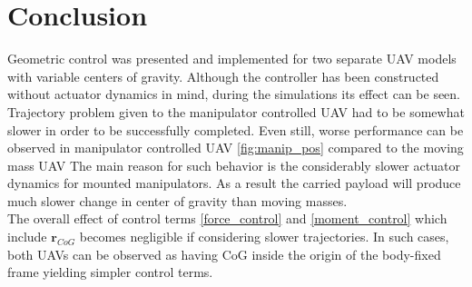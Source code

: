 \section{Conclusion}

Geometric control was presented and implemented for two separate UAV models with variable centers of gravity. Although the controller has been constructed without actuator dynamics in mind, during the simulations its effect can be seen. Trajectory problem given to the manipulator controlled UAV had to be somewhat slower in order to be successfully completed. Even still, worse performance can be observed in manipulator controlled UAV \ref{fig:manip_pos} compared to the moving mass UAV 
The main reason for such behavior is the considerably slower actuator dynamics for mounted manipulators. As a result the carried payload will produce much slower change in center of gravity than moving masses. \\
The overall effect of control terms \ref{force_control} and \ref{moment_control} which include $\textbf{r}_{CoG}$ becomes negligible if considering slower trajectories. In such cases, both UAVs can be observed as having CoG inside the origin of the body-fixed frame yielding simpler control terms.
